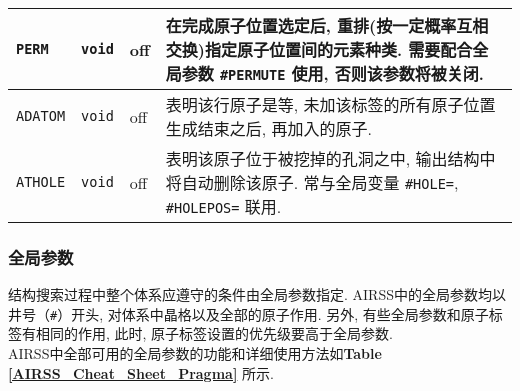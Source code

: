 \documentclass[a4paper, 10pt]{article}
\begin{document}
\begin{center}
\begin{longtable}{m{10em}|m{4em}<{\centering}|m{3em}<{\centering}|m{15em}}
\midrule
\verb|PERM| & \verb|void| & off & 在完成原子位置选定后, 重排(按一定概率互相交换)指定原子位置间的元素种类. 需要配合全局参数 \verb|#PERMUTE| 使用, 否则该参数将被关闭.\\
\midrule
\verb|ADATOM| & \verb|void| & off & 表明该行原子是等, 未加该标签的所有原子位置生成结束之后, 再加入的原子.\\
\midrule
\verb|ATHOLE| & \verb|void| & off & 表明该原子位于被挖掉的孔洞之中, 输出结构中将自动删除该原子. 常与全局变量 \verb|#HOLE=|, \verb|#HOLEPOS=| 联用.\\
\bottomrule
\end{longtable}
\end{center}

\subsubsection{全局参数}

结构搜索过程中整个体系应遵守的条件由全局参数指定.  AIRSS中的全局参数均以井号（\verb|#|）开头, 对体系中晶格以及全部的原子作用. 另外, 有些全局参数和原子标签有相同的作用, 此时, 原子标签设置的优先级要高于全局参数.\\

AIRSS中全部可用的全局参数的功能和详细使用方法如\textbf{Table \ref{AIRSS_Cheat_Sheet_Pragma}} 所示.
\end{document}
